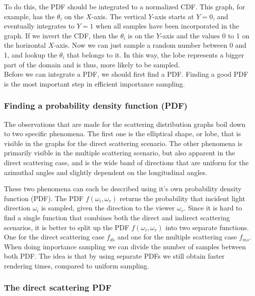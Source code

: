 \documentclass[11pt,a4paper]{report}
\begin{document}
To do this, the PDF should be integrated to a normalized CDF. This graph, for example, has the $\theta_i$ on the $X$-axis. The vertical $Y$-axis starts at $Y=0$, and eventually integrates to $Y=1$ when all samples have been incorporated in the graph. If we invert the CDF, then the $\theta_i$ is on the $Y$-axis and the values 0 to 1 on the horizontal $X$-axis. Now we can just sample a random number between 0 and 1, and lookup the $\theta_i$ that belongs to it. In this way, the lobe represents a bigger part of the domain and is thus, more likely to be sampled.\\

Before we can integrate a PDF, we should first find a PDF. Finding a good PDF is the most important step in efficient importance sampling.

\subsubsection{Finding a probability density function (PDF)}

The observations that are made for the scattering distribution graphs boil down to two specific phenomena. The first one is the elliptical shape, or lobe, that is visible in the graphs for the direct scattering scenario. The other phenomena is primarily visible in the multiple scattering scenario, but also apparent in the direct scattering case, and is the wide band of directions that are uniform for the azimuthal angles and slightly dependent on the longitudinal angles.

These two phenomena can each be described using it's own probability density function (PDF). The PDF $f(\omega_i, \omega_r)$ returns the probability that incident light direction $\omega_i$ is sampled, given the direction to the viewer $\omega_r$. Since it is hard to find a single function that combines both the direct and indirect scattering scenarios, it is better to split up the PDF $f(\omega_i, \omega_r)$ into two separate functions. One for the direct scattering case $f_{ds}$ and one for the multiple scattering case $f_{ms}$. When doing importance sampling we can divide the number of samples between both PDF. The idea is that by using separate PDFs we still obtain faster rendering times, compared to uniform sampling.

\subsubsection{The direct scattering PDF}
\end{document}
